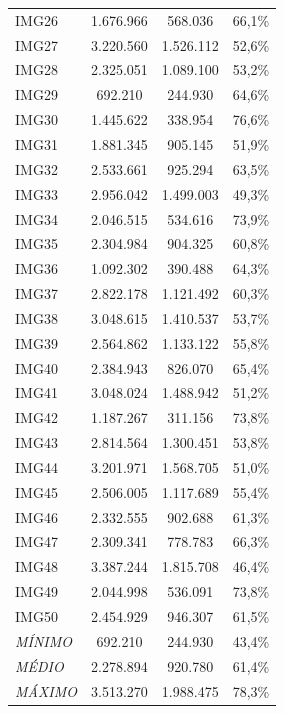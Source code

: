 \begin{table}[H]
\begin{tabularx}{\textwidth}{X|C|C|C}
        IMG26 & 1.676.966 & 568.036 & 66,1\% \\ 
        IMG27 & 3.220.560 & 1.526.112 & 52,6\% \\ 
        IMG28 & 2.325.051 & 1.089.100 & 53,2\% \\ 
        IMG29 & 692.210 & 244.930 & 64,6\% \\ 
        IMG30 & 1.445.622 & 338.954 & 76,6\% \\ 
        IMG31 & 1.881.345 & 905.145 & 51,9\% \\ 
        IMG32 & 2.533.661 & 925.294 & 63,5\% \\ 
        IMG33 & 2.956.042 & 1.499.003 & 49,3\% \\ 
        IMG34 & 2.046.515 & 534.616 & 73,9\% \\ 
        IMG35 & 2.304.984 & 904.325 & 60,8\% \\ 
        IMG36 & 1.092.302 & 390.488 & 64,3\% \\ 
        IMG37 & 2.822.178 & 1.121.492 & 60,3\% \\ 
        IMG38 & 3.048.615 & 1.410.537 & 53,7\% \\ 
        IMG39 & 2.564.862 & 1.133.122 & 55,8\% \\ 
        IMG40 & 2.384.943 & 826.070 & 65,4\% \\ 
        IMG41 & 3.048.024 & 1.488.942 & 51,2\% \\ 
        IMG42 & 1.187.267 & 311.156 & 73,8\% \\ 
        IMG43 & 2.814.564 & 1.300.451 & 53,8\% \\ 
        IMG44 & 3.201.971 & 1.568.705 & 51,0\% \\ 
        IMG45 & 2.506.005 & 1.117.689 & 55,4\% \\ 
        IMG46 & 2.332.555 & 902.688 & 61,3\% \\ 
        IMG47 & 2.309.341 & 778.783 & 66,3\% \\ 
        IMG48 & 3.387.244 & 1.815.708 & 46,4\% \\ 
        IMG49 & 2.044.998 & 536.091 & 73,8\% \\ 
        IMG50 & 2.454.929 & 946.307 & 61,5\% \\ \hline
        \textit{MÍNIMO} & 692.210 & 244.930 & 43,4\% \\ 
        \textit{MÉDIO} & 2.278.894 & 920.780 & 61,4\% \\ 
        \textit{MÁXIMO} & 3.513.270 & 1.988.475 & 78,3\% \\ 
    \end{tabularx}

    \autoriaPropria
\end{table}

